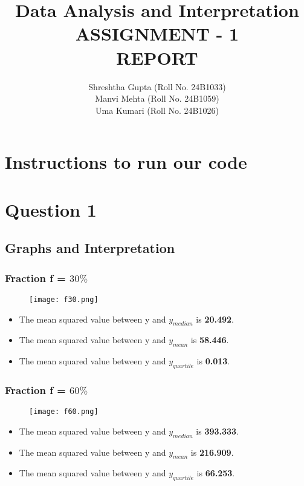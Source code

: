 \documentclass[12pt]{article}
\title{Data Analysis and Interpretation \\ASSIGNMENT - 1\\ REPORT}
\author{Shreshtha Gupta (Roll No. 24B1033) \\ Manvi Mehta (Roll No. 24B1059) \\ Uma Kumari (Roll No. 24B1026)}
\begin{document}
\maketitle
\tableofcontents 
\newpage
\section{Instructions to run our code}
\section{Question 1}
\subsection{Graphs and Interpretation}
\subsubsection{Fraction f = $30\%$}
\begin{figure}[h]
    \centering
    \texttt{[image: f30.png]}
\end{figure}
\begin{itemize}
    \item The mean squared value between y and $y_{median}$ is \textbf{20.492}.
    \item The mean squared value between y and $y_{mean}$ is \textbf{58.446}.
    \item The mean squared value between y and $y_{quartile}$ is \textbf{ 0.013}.
\end{itemize}
\subsubsection{Fraction f = $60\%$}
\begin{figure}[h]
    \centering
    \texttt{[image: f60.png]}
\end{figure}
\begin{itemize}
    \item The mean squared value between y and $y_{median}$ is \textbf{ 393.333}.
    \item The mean squared value between y and $y_{mean}$ is \textbf{216.909}.
    \item The mean squared value between y and $y_{quartile}$ is \textbf{66.253}.
\end{itemize}
\end{document}
